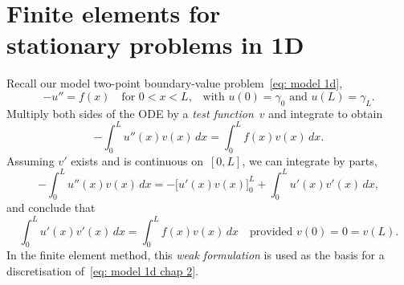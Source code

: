 \chapter[Finite elements in 1D]{Finite elements for \\
stationary problems in 1D}\label{chap: FEM 1d}

Recall our model two-point boundary-value problem~\ref{eq: model 1d}, 
\begin{equation}\label{eq: model 1d chap 2}
-u''=f(x)\quad\text{for $0<x<L$,}
	\quad\text{with $u(0)=\gamma_0$ and $u(L)=\gamma_L$.}
\end{equation}
Multiply both sides of the ODE by a \emph{test function}~$v$ and integrate to 
obtain
\[
-\int_0^L u''(x)v(x)\,dx=\int_0^L f(x)v(x)\,dx.
\]
Assuming $v'$ exists and is continuous on~$[0,L]$, we can integrate by parts,
\begin{equation}\label{eq: int by parts}
-\int_0^L u''(x)v(x)\,dx=-\bigl[u'(x)v(x)\bigr]_0^L+\int_0^Lu'(x)v'(x)\,dx,
\end{equation}
and conclude that
\begin{equation}\label{eq: model 1d weak}
\int_0^L u'(x)v'(x)\,dx=\int_0^L f(x)v(x)\,dx
	\quad\text{provided $v(0)=0=v(L)$.}
\end{equation}
In the finite element method, this \emph{weak formulation} 
is used as the basis for a discretisation of~\eqref{eq: model 1d chap 2}.

